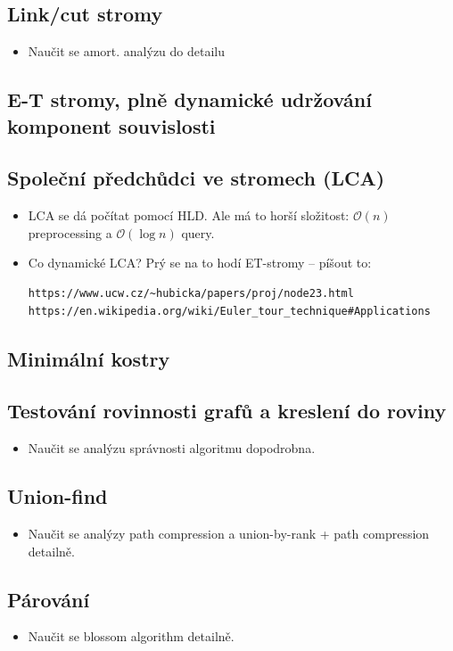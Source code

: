 \documentclass{article}
\theoremstyle{noparens}
\theoremstyle{noparens-mys}
\theoremstyle{noparens-note}
\newcommand{\OO}{\mathcal{O}}
\begin{document}
\subsection{Link/cut stromy}
\begin{itemize}
    \item Naučit se amort. analýzu do detailu
\end{itemize}

\subsection{E-T stromy, plně dynamické udržování komponent souvislosti}

\subsection{Společní předchůdci ve stromech (LCA)}
\begin{itemize}
    \item LCA se dá počítat pomocí HLD.  Ale má to horší složitost: $\OO(n)$
        preprocessing a $\OO(\log n)$ query.
    \item Co dynamické LCA?  Prý se na to hodí ET-stromy -- píšout to:
\begin{verbatim}
https://www.ucw.cz/~hubicka/papers/proj/node23.html
https://en.wikipedia.org/wiki/Euler_tour_technique#Applications
\end{verbatim}
\end{itemize}

\subsection{Minimální kostry}

\subsection{Testování rovinnosti grafů a kreslení do roviny}
\begin{itemize}
    \item Naučit se analýzu správnosti algoritmu dopodrobna.
\end{itemize}

\subsection{Union-find}
\begin{itemize}
    \item Naučit se analýzy path compression a union-by-rank + path compression
        detailně.
\end{itemize}

\subsection{Párování}
\begin{itemize}
    \item Naučit se blossom algorithm detailně.
\end{itemize}
\end{document}
